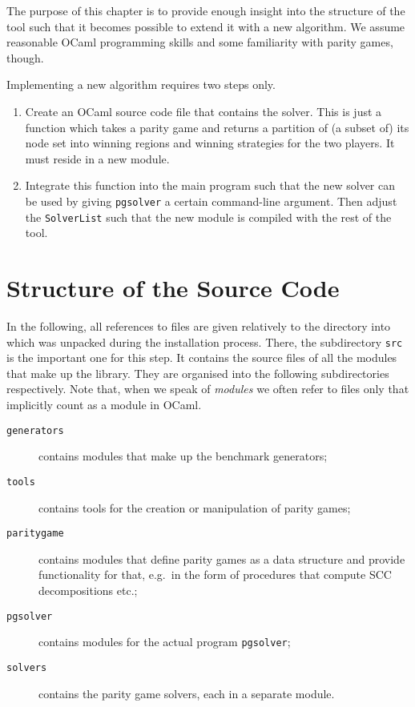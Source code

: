\label{chp:devguide}

The purpose of this chapter is to provide enough insight into the structure
of the \pgsolver tool such that it becomes possible to extend it with a new algorithm.
We assume reasonable OCaml programming skills and some familiarity with parity games, though.

Implementing a new algorithm requires two steps only.
\begin{enumerate}
\item Create an OCaml source code file that contains the solver. This is just a function
      which takes a parity game and returns a partition of (a subset of) its node set into
      winning regions and winning strategies for the two players. It must reside in a new
      module.
\item Integrate this function into the main program such that the new solver can be used
      by giving \texttt{pgsolver} a certain command-line argument. Then adjust the
      \texttt{SolverList} such that the new module is compiled with the rest of the tool.
\end{enumerate}


\section{Structure of the Source Code}

In the following, all references to files are given relatively to the directory into which
\pgsolver was unpacked during the installation process. There, the subdirectory \texttt{src}
is the important one for this step. It contains the source files of all the modules that
make up the \pgsolver library. They are organised into the following subdirectories respectively.
Note that, when we speak of \emph{modules} we often refer to files only that implicitly count as
a module in OCaml.
\begin{description}
\item[\texttt{generators}] contains modules that make up the benchmark generators;
\item[\texttt{tools}] contains tools for the creation or manipulation of parity games;
\item[\texttt{paritygame}] contains modules that define parity games as a data structure and
     provide functionality for that, e.g.\ in the form of procedures that compute SCC decompositions
     etc.;
\item[\texttt{pgsolver}] contains modules for the actual program \texttt{pgsolver};
\item[\texttt{solvers}] contains the parity game solvers, each in a separate module.
\end{description}

